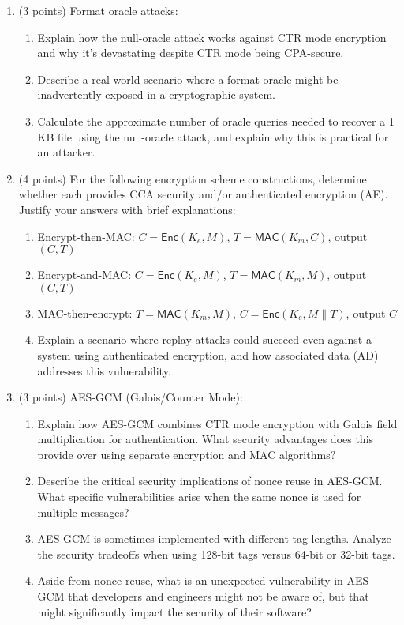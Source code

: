 \documentclass[10pt,a4paper,american]{exam}
\begin{document}
\begin{enumerate}
	\item (3 points) Format oracle attacks:
	      \begin{enumerate}
		      \item Explain how the null-oracle attack works against CTR mode encryption and why it's devastating despite CTR mode being CPA-secure.
		      \item Describe a real-world scenario where a format oracle might be inadvertently exposed in a cryptographic system.
		      \item Calculate the approximate number of oracle queries needed to recover a 1 KB file using the null-oracle attack, and explain why this is practical for an attacker.
	      \end{enumerate}

	\item (4 points) For the following encryption scheme constructions, determine whether each provides CCA security and/or authenticated encryption (AE). Justify your answers with brief explanations:
	      \begin{enumerate}
		      \item Encrypt-then-MAC: $C = \textsf{Enc}(K_e, M)$, $T = \textsf{MAC}(K_m, C)$, output $(C, T)$
		      \item Encrypt-and-MAC: $C = \textsf{Enc}(K_e, M)$, $T = \textsf{MAC}(K_m, M)$, output $(C, T)$
		      \item MAC-then-encrypt: $T = \textsf{MAC}(K_m, M)$, $C = \textsf{Enc}(K_e, M\|T)$, output $C$
		      \item Explain a scenario where replay attacks could succeed even against a system using authenticated encryption, and how associated data (AD) addresses this vulnerability.
	      \end{enumerate}

	\item (3 points) AES-GCM (Galois/Counter Mode):
	      \begin{enumerate}
		      \item Explain how AES-GCM combines CTR mode encryption with Galois field multiplication for authentication. What security advantages does this provide over using separate encryption and MAC algorithms?
		      \item Describe the critical security implications of nonce reuse in AES-GCM. What specific vulnerabilities arise when the same nonce is used for multiple messages?
		      \item AES-GCM is sometimes implemented with different tag lengths. Analyze the security tradeoffs when using 128-bit tags versus 64-bit or 32-bit tags.
		      \item Aside from nonce reuse, what is an unexpected vulnerability in AES-GCM that developers and engineers might not be aware of, but that might significantly impact the security of their software?
	      \end{enumerate}
\end{enumerate}
\end{document}
